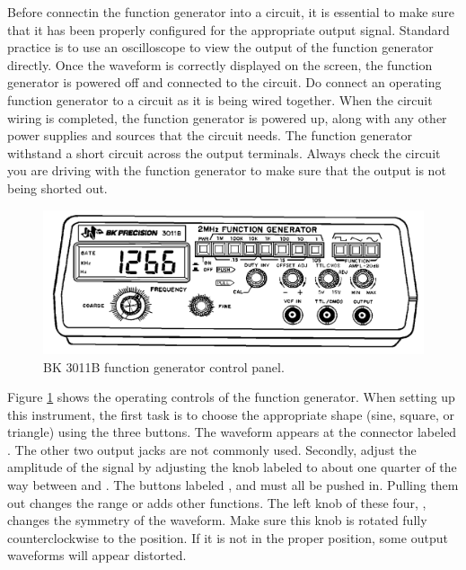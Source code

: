 \documentclass[12pt, a4paper, oneside, openright, titlepage]{book}
\begin{document}
\noindent Before connectin the function generator into a circuit, it is essential to make sure that it has been properly configured for the appropriate output signal. Standard practice is to use an oscilloscope to view the output of the function generator directly. Once the waveform is correctly displayed on the screen, the function generator is powered off and connected to the circuit. Do  connect an operating function generator to a circuit as it is being wired together. When the circuit wiring is completed, the function generator is powered up, along with any other power supplies and sources that the circuit needs. The function generator  withstand a short circuit across the output terminals. Always check the circuit you are driving with the function generator to make sure that the output is not being shorted out.

\begin{figure}[H]
    \centering
    \includegraphics[scale = 0.8]{Images/ACDC5.PNG}
    \caption{BK 3011B function generator control panel.}
    \label{fig:ACDC5}
\end{figure}

Figure \ref{fig:ACDC5} shows the operating controls of the function generator. When setting up this instrument, the first task is to choose the appropriate shape (sine, square, or triangle) using the three  buttons. The waveform appears at the connector labeled . The other two output jacks are not commonly used. Secondly, adjust the amplitude of the signal by adjusting the knob labeled  to about one quarter of the way between  and . The buttons labeled , and  must all be pushed in. Pulling them out changes the range or adds other functions. The left knob of these four, , changes the symmetry of the waveform. Make sure this knob is rotated fully counterclockwise to the  position. If it is not in the proper position, some output waveforms will appear distorted.
\end{document}
